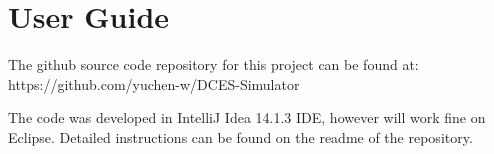 \chapter{User Guide}
\label{Guide}

The github source code repository for this project can be found at: https://github.com/yuchen-w/DCES-Simulator

The code was developed in IntelliJ Idea 14.1.3 IDE, however will work fine on Eclipse. Detailed instructions can be found on the readme of the repository.